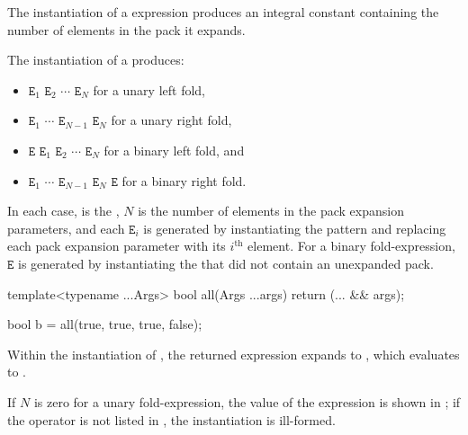 \pnum
The instantiation of a  expression produces
an integral constant containing the number of elements in the pack
it expands.

\pnum
The instantiation of a  produces:
\begin{itemize}
\item
\tcode{((}$\mathtt{E}_1$
            $\mathtt{E}_2$\tcode{)}
            $\cdots$\tcode{)}
            $\mathtt{E}_N$
for a unary left fold,
\item
         $\mathtt{E}_1$     
\tcode{(}$\cdots$           
\tcode{(}$\mathtt{E}_{N-1}$ 
         $\mathtt{E}_N$\tcode{))}
for a unary right fold,
\item
\tcode{(((}$\mathtt{E}$
             $\mathtt{E}_1$\tcode{)}
             $\mathtt{E}_2$\tcode{)}
             $\cdots$\tcode{)}
             $\mathtt{E}_N$
for a binary left fold, and
\item
         $\mathtt{E}_1$     
\tcode{(}$\cdots$           
\tcode{(}$\mathtt{E}_{N-1}$ 
\tcode{(}$\mathtt{E}_{N}$   
         $\mathtt{E}$\tcode{)))}
for a binary right fold.
\end{itemize}

In each case,
 is the ,
$N$ is the number of elements in the pack expansion parameters,
and each $\mathtt{E}_i$ is generated by instantiating the pattern
and replacing each pack expansion parameter with its $i^\text{th}$ element.
For a binary fold-expression,
$\mathtt{E}$ is generated
by instantiating the 
that did not contain an unexpanded pack.
\begin{example}
\begin{codeblock}
template<typename ...Args>
  bool all(Args ...args) { return (... && args); }

bool b = all(true, true, true, false);
\end{codeblock}
Within the instantiation of ,
the returned expression expands to
,
which evaluates to .
\end{example}
If $N$ is zero for a unary fold-expression,
the value of the expression is shown in ;
if the operator is not listed in ,
the instantiation is ill-formed.

